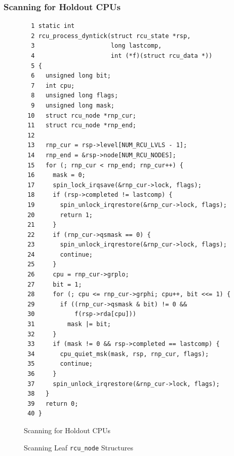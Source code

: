 \subsubsection{Scanning for Holdout CPUs}
\label{app:rcuimpl:rcutreewt:Scanning for Holdout CPUs}

\begin{figure}[tbp]
{ \scriptsize
\begin{verbatim}
  1 static int
  2 rcu_process_dyntick(struct rcu_state *rsp,
  3                     long lastcomp,
  4                     int (*f)(struct rcu_data *))
  5 {
  6   unsigned long bit;
  7   int cpu;
  8   unsigned long flags;
  9   unsigned long mask;
 10   struct rcu_node *rnp_cur;
 11   struct rcu_node *rnp_end;
 12 
 13   rnp_cur = rsp->level[NUM_RCU_LVLS - 1];
 14   rnp_end = &rsp->node[NUM_RCU_NODES];
 15   for (; rnp_cur < rnp_end; rnp_cur++) {
 16     mask = 0;
 17     spin_lock_irqsave(&rnp_cur->lock, flags);
 18     if (rsp->completed != lastcomp) {
 19       spin_unlock_irqrestore(&rnp_cur->lock, flags);
 20       return 1;
 21     }
 22     if (rnp_cur->qsmask == 0) {
 23       spin_unlock_irqrestore(&rnp_cur->lock, flags);
 24       continue;
 25     }
 26     cpu = rnp_cur->grplo;
 27     bit = 1;
 28     for (; cpu <= rnp_cur->grphi; cpu++, bit <<= 1) {
 29       if ((rnp_cur->qsmask & bit) != 0 &&
 30           f(rsp->rda[cpu]))
 31         mask |= bit;
 32     }
 33     if (mask != 0 && rsp->completed == lastcomp) {
 34       cpu_quiet_msk(mask, rsp, rnp_cur, flags);
 35       continue;
 36     }
 37     spin_unlock_irqrestore(&rnp_cur->lock, flags);
 38   }
 39   return 0;
 40 }
\end{verbatim}
}
\caption{Scanning for Holdout CPUs}
\label{fig:app:rcuimpl:rcutreewt:Scanning for Holdout CPUs}
\end{figure}

\begin{figure}[tb]
\begin{center}
\end{center}
\caption{Scanning Leaf {\tt rcu\_node} Structures}
\label{fig:app:rcuimpl:rcutree:Scanning Leaf rcu-node Structures}
\end{figure}

